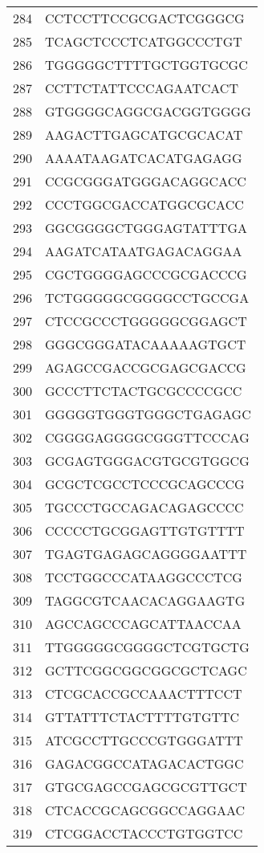 \documentclass[letterpaper,12pt]{article}
\numberwithin{equation}{appendix}
\begin{document}
{{\begin{table}[ht]
\begin{tabular}{rl}
  284 & CCTCCTTCCGCGACTCGGGCG \\ 
  285 & TCAGCTCCCTCATGGCCCTGT \\ 
  286 & TGGGGGCTTTTGCTGGTGCGC \\ 
  287 & CCTTCTATTCCCAGAATCACT \\ 
  288 & GTGGGGCAGGCGACGGTGGGG \\ 
  289 & AAGACTTGAGCATGCGCACAT \\ 
  290 & AAAATAAGATCACATGAGAGG \\ 
  291 & CCGCGGGATGGGACAGGCACC \\ 
  292 & CCCTGGCGACCATGGCGCACC \\ 
  293 & GGCGGGGCTGGGAGTATTTGA \\ 
  294 & AAGATCATAATGAGACAGGAA \\ 
  295 & CGCTGGGGAGCCCGCGACCCG \\ 
  296 & TCTGGGGGCGGGGCCTGCCGA \\ 
  297 & CTCCGCCCTGGGGGCGGAGCT \\ 
  298 & GGGCGGGATACAAAAAGTGCT \\ 
  299 & AGAGCCGACCGCGAGCGACCG \\ 
  300 & GCCCTTCTACTGCGCCCCGCC \\ 
  301 & GGGGGTGGGTGGGCTGAGAGC \\ 
  302 & CGGGGAGGGGCGGGTTCCCAG \\ 
  303 & GCGAGTGGGACGTGCGTGGCG \\ 
  304 & GCGCTCGCCTCCCGCAGCCCG \\ 
  305 & TGCCCTGCCAGACAGAGCCCC \\ 
  306 & CCCCCTGCGGAGTTGTGTTTT \\ 
  307 & TGAGTGAGAGCAGGGGAATTT \\ 
  308 & TCCTGGCCCATAAGGCCCTCG \\ 
  309 & TAGGCGTCAACACAGGAAGTG \\ 
  310 & AGCCAGCCCAGCATTAACCAA \\ 
  311 & TTGGGGGCGGGGCTCGTGCTG \\ 
  312 & GCTTCGGCGGCGGCGCTCAGC \\ 
  313 & CTCGCACCGCCAAACTTTCCT \\ 
  314 & GTTATTTCTACTTTTGTGTTC \\ 
  315 & ATCGCCTTGCCCGTGGGATTT \\ 
  316 & GAGACGGCCATAGACACTGGC \\ 
  317 & GTGCGAGCCGAGCGCGTTGCT \\ 
  318 & CTCACCGCAGCGGCCAGGAAC \\ 
  319 & CTCGGACCTACCCTGTGGTCC \\ 
   \hline
\end{tabular}
\end{table}}}
\end{document}

